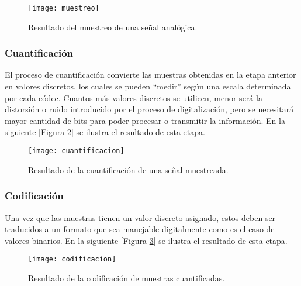 	\begin{figure}[h]
		\texttt{[image: muestreo]}
		
		\caption{Resultado del muestreo de una señal analógica.}
		
		\centering
		
		\label{fig:muestreo}
	\end{figure}

\subsubsection{Cuantificación}
El proceso de cuantificación convierte las muestras obtenidas en la etapa anterior en valores discretos, los cuales se pueden “medir” según una escala determinada por cada códec. Cuantos más valores discretos se utilicen, menor será la distorsión o ruido introducido por el proceso de digitalización, pero se necesitará mayor cantidad de bits para poder procesar o transmitir la información. En la siguiente [Figura \ref{fig:cuantificacion}] se ilustra el resultado de esta etapa.

	\begin{figure}[h]
		\texttt{[image: cuantificacion]}
		
		\caption{Resultado de la cuantificación de una señal muestreada.}
		
		\centering
		
		\label{fig:cuantificacion}
	\end{figure}

\subsubsection{Codificación}
Una vez que las muestras tienen un valor discreto asignado, estos deben ser traducidos a un formato que sea manejable digitalmente como es el caso de valores binarios. En la siguiente [Figura \ref{fig:codificacion}] se ilustra el resultado de esta etapa. 

	\begin{figure}[h]
		\texttt{[image: codificacion]}
		
		\caption{Resultado de la codificación de muestras cuantificadas.}
		
		\centering
		
		\label{fig:codificacion}
	\end{figure}

